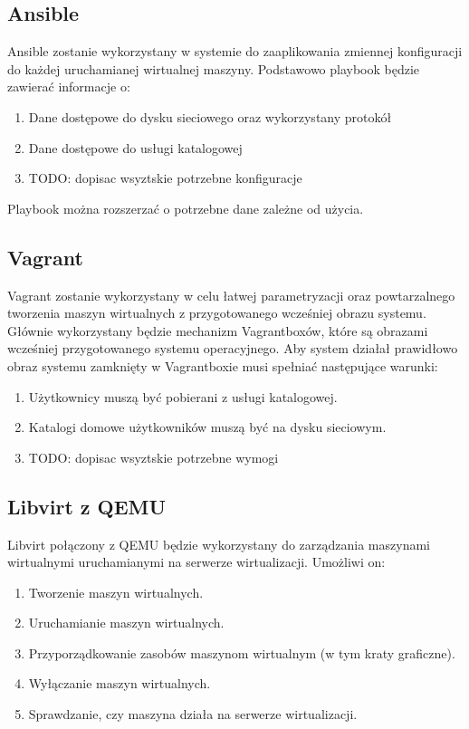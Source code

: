 \documentclass[../deliverable-two.tex]{subfiles}
\begin{document}
\label{external-tools}

\subsection{Ansible}
Ansible zostanie wykorzystany w systemie do zaaplikowania zmiennej konfiguracji do każdej uruchamianej wirtualnej maszyny.
Podstawowo playbook będzie zawierać informacje o:
\begin{enumerate}
	\item Dane dostępowe do dysku sieciowego oraz wykorzystany protokół
	\item Dane dostępowe do usługi katalogowej
	\item TODO: dopisac wsyztskie potrzebne konfiguracje
\end{enumerate}
Playbook można rozszerzać o potrzebne dane zależne od użycia.

\subsection{Vagrant}
Vagrant zostanie wykorzystany w celu łatwej parametryzacji oraz powtarzalnego tworzenia maszyn wirtualnych z przygotowanego wcześniej obrazu systemu.
Głównie wykorzystany będzie mechanizm Vagrantboxów, które są obrazami wcześniej przygotowanego systemu operacyjnego.
Aby system działał prawidłowo obraz systemu zamknięty w Vagrantboxie musi spełniać następujące warunki:
\begin{enumerate}
	\item Użytkownicy muszą być pobierani z usługi katalogowej.
	\item Katalogi domowe użytkowników muszą być na dysku sieciowym.
	\item TODO: dopisac wsyztskie potrzebne wymogi
\end{enumerate}

\subsection{Libvirt z QEMU}
Libvirt połączony z QEMU będzie wykorzystany do zarządzania maszynami wirtualnymi uruchamianymi na serwerze wirtualizacji.
Umożliwi on:
\begin{enumerate}
	\item Tworzenie maszyn wirtualnych.
	\item Uruchamianie maszyn wirtualnych.
	\item Przyporządkowanie zasobów maszynom wirtualnym (w tym kraty graficzne).
	\item Wyłączanie maszyn wirtualnych.
	\item Sprawdzanie, czy maszyna działa na serwerze wirtualizacji.
\end{enumerate}
\end{document}
